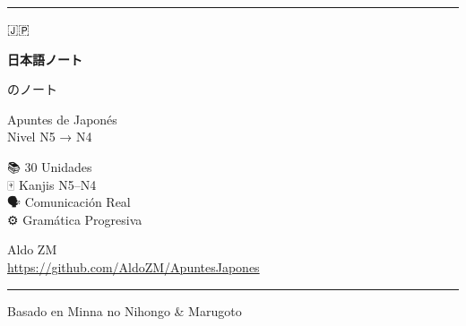 \begin{titlepage}
  \begin{center}
    \vspace*{1.5cm}
    {\color{jpred}\rule{\linewidth}{3pt}}
    \vspace{1cm}

    {\fontsize{60}{70}\selectfont 🇯🇵}

    \vspace{0.5cm}
    {\Huge\bfseries\color{jpred} 日本語ノート}

    \vspace{0.3cm}
    {\Large\color{jpblue} のノート}

    \vspace{0.5cm}
    {\large Apuntes de Japonés} \\[0.3em]
    {\large\color{darkgray} Nivel N5 → N4}

    \vspace{1cm}
    \begin{tcolorbox}[
      width=0.65\linewidth,
      colback=jpgold!10, colframe=jpgold!70!black,
      rounded corners, halign=center
    ]
    \large
    📚 30 Unidades \\[4pt]
    🀄 Kanjis N5--N4 \\[4pt]
    🗣️ Comunicación Real \\[4pt]
    ⚙️ Gramática Progresiva
    \end{tcolorbox}

    \vspace{1cm}
    {\large Aldo ZM} \\[0.3em]
    {\small\color{darkgray}\url{https://github.com/AldoZM/ApuntesJapones}}

    \vfill
    {\color{jpred}\rule{\linewidth}{3pt}}
    {\small\color{darkgray} Basado en Minna no Nihongo \& Marugoto}
  \end{center}
\end{titlepage}
